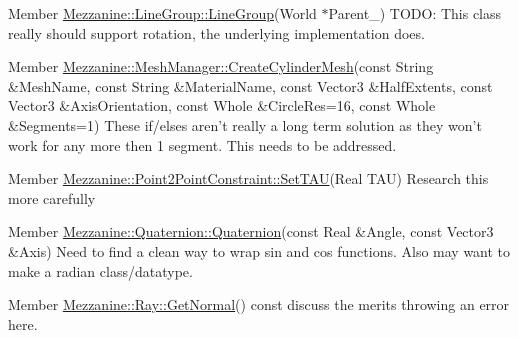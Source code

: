 \label{todo__todo000014}
\hypertarget{todo__todo000014}{}
 
\begin{DoxyDescription}
\item[Member \hyperlink{classMezzanine_1_1LineGroup_a8789254da1d3e930681b793165fedeca}{Mezzanine::LineGroup::LineGroup}(World $\ast$Parent\_\-) ]TODO: This class really should support rotation, the underlying implementation does. 
\end{DoxyDescription}

\label{todo__todo000017}
\hypertarget{todo__todo000017}{}
 
\begin{DoxyDescription}
\item[Member \hyperlink{classMezzanine_1_1MeshManager_a6de2e01b43302a9439dc01c1dcc90f4c}{Mezzanine::MeshManager::CreateCylinderMesh}(const String \&MeshName, const String \&MaterialName, const Vector3 \&HalfExtents, const Vector3 \&AxisOrientation, const Whole \&CircleRes=16, const Whole \&Segments=1) ]These if/elses aren't really a long term solution as they won't work for any more then 1 segment. This needs to be addressed. 
\end{DoxyDescription}

\label{todo__todo000008}
\hypertarget{todo__todo000008}{}
 
\begin{DoxyDescription}
\item[Member \hyperlink{classMezzanine_1_1Point2PointConstraint_a9eba349fe0f12483330b9c309e305168}{Mezzanine::Point2PointConstraint::SetTAU}(Real TAU) ]Research this more carefully 
\end{DoxyDescription}

\label{todo__todo000019}
\hypertarget{todo__todo000019}{}
 
\begin{DoxyDescription}
\item[Member \hyperlink{classMezzanine_1_1Quaternion_a86a46d0ce78a6ce83cc40ed2d03349d4}{Mezzanine::Quaternion::Quaternion}(const Real \&Angle, const Vector3 \&Axis) ]Need to find a clean way to wrap sin and cos functions. Also may want to make a radian class/datatype. 
\end{DoxyDescription}

\label{todo__todo000020}
\hypertarget{todo__todo000020}{}
 
\begin{DoxyDescription}
\item[Member \hyperlink{classMezzanine_1_1Ray_a7164d929caf75bcebceed9149e9a3540}{Mezzanine::Ray::GetNormal}() const  ]discuss the merits throwing an error here. 
\end{DoxyDescription}

